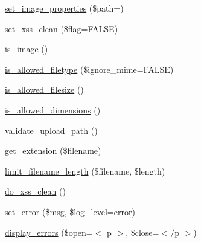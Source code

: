 \begin{DoxyCompactItemize}
\item 
\mbox{\hyperlink{class_c_i___upload_a80c9b8c6e9f28d1f2a5a7e572c38915f}{set\+\_\+image\+\_\+properties}} (\$path=\textquotesingle{}\textquotesingle{})
\item 
\mbox{\hyperlink{class_c_i___upload_a5556024223414507d84d221862919212}{set\+\_\+xss\+\_\+clean}} (\$flag=F\+A\+L\+SE)
\item 
\mbox{\hyperlink{class_c_i___upload_af6f513bc693e3ba836f23fe9bebc6427}{is\+\_\+image}} ()
\item 
\mbox{\hyperlink{class_c_i___upload_a248e8cef69fc954953dc988e8d82afca}{is\+\_\+allowed\+\_\+filetype}} (\$ignore\+\_\+mime=F\+A\+L\+SE)
\item 
\mbox{\hyperlink{class_c_i___upload_aa1283241c3b2fc700c7b577beecd5f97}{is\+\_\+allowed\+\_\+filesize}} ()
\item 
\mbox{\hyperlink{class_c_i___upload_a70d66ccc85ab4ec9e76e02cfeaccc193}{is\+\_\+allowed\+\_\+dimensions}} ()
\item 
\mbox{\hyperlink{class_c_i___upload_a067f092935018f0d1fbfa955ddecfee3}{validate\+\_\+upload\+\_\+path}} ()
\item 
\mbox{\hyperlink{class_c_i___upload_a6c656eedccb1131accc8e350bc50632f}{get\+\_\+extension}} (\$filename)
\item 
\mbox{\hyperlink{class_c_i___upload_ab1f627192a69c4b88a44ad60ba05d0af}{limit\+\_\+filename\+\_\+length}} (\$filename, \$length)
\item 
\mbox{\hyperlink{class_c_i___upload_ae7e5f9b6d774795da126647f10c3c2a6}{do\+\_\+xss\+\_\+clean}} ()
\item 
\mbox{\hyperlink{class_c_i___upload_aab6e33df2ad916fc21e93a84b6fd48bf}{set\+\_\+error}} (\$msg, \$log\+\_\+level=\textquotesingle{}error\textquotesingle{})
\item 
\mbox{\hyperlink{class_c_i___upload_a71a6f2e6d97ff5347257f101002bc903}{display\+\_\+errors}} (\$open=\textquotesingle{}$<$ p $>$\textquotesingle{}, \$close=\textquotesingle{}$<$/p $>$\textquotesingle{})
\end{DoxyCompactItemize}
